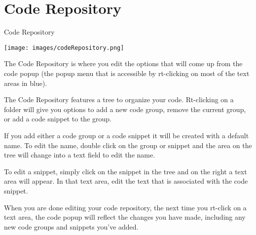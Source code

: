 \section{Code Repository}\label{codeRepository}

Code Repository

\texttt{[image: images/codeRepository.png]}

The Code Repository is where you edit the options that will come up from
the code popup (the popup menu that is accessible by rt-clicking on most
of the text areas in blue).

The Code Repository features a tree to organize your code. Rt-clicking
on a folder will give you options to add a new code group, remove the
current group, or add a code snippet to the group.

If you add either a code group or a code snippet it will be created with
a default name. To edit the name, double click on the group or snippet
and the area on the tree will change into a text field to edit the name.

To edit a snippet, simply click on the snippet in the tree and on the
right a text area will appear. In that text area, edit the text that is
associated with the code snippet.

When you are done editing your code repository, the next time you
rt-click on a text area, the code popup will reflect the changes you
have made, including any new code groups and snippets you've added.
